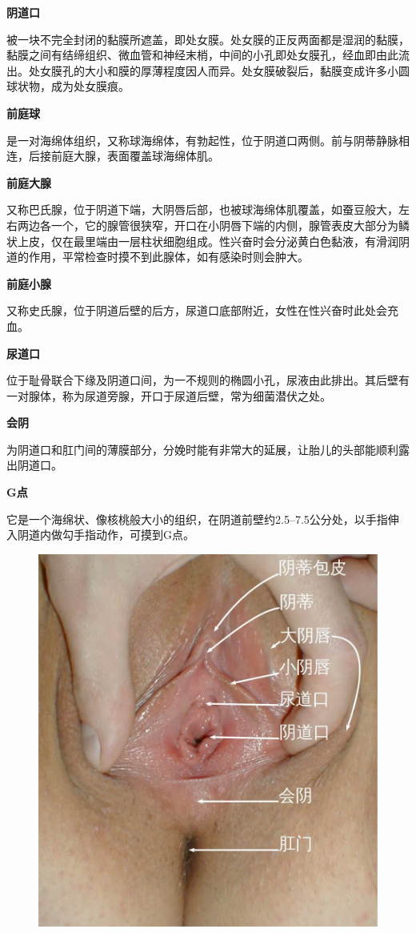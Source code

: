 \documentclass[12pt,UTF8]{ctexbook}
\begin{document}
\textbf{阴道口}

被一块不完全封闭的黏膜所遮盖，即处女膜。处女膜的正反两面都是湿润的黏膜，黏膜之间有结缔组织、微血管和神经末梢，中间的小孔即处女膜孔，经血即由此流出。处女膜孔的大小和膜的厚薄程度因人而异。处女膜破裂后，黏膜变成许多小圆球状物，成为处女膜痕。

\textbf{前庭球}

是一对海绵体组织，又称球海绵体，有勃起性，位于阴道口两侧。前与阴蒂静脉相连，后接前庭大腺，表面覆盖球海绵体肌。

\textbf{前庭大腺}

又称巴氏腺，位于阴道下端，大阴唇后部，也被球海绵体肌覆盖，如蚕豆般大，左右两边各一个，它的腺管很狭窄，开口在小阴唇下端的内侧，腺管表皮大部分为鳞状上皮，仅在最里端由一层柱状细胞组成。性兴奋时会分泌黄白色黏液，有滑润阴道的作用，平常检查时摸不到此腺体，如有感染时则会肿大。

\textbf{前庭小腺}

又称史氏腺，位于阴道后壁的后方，尿道口底部附近，女性在性兴奋时此处会充血。

\textbf{尿道口}

位于耻骨联合下缘及阴道口间，为一不规则的椭圆小孔，尿液由此排出。其后壁有一对腺体，称为尿道旁腺，开口于尿道后壁，常为细菌潜伏之处。

\textbf{会阴}

为阴道口和肛门间的薄膜部分，分娩时能有非常大的延展，让胎儿的头部能顺利露出阴道口。

\textbf{G点}

它是一个海绵状、像核桃般大小的组织，在阴道前壁约2.5--7.5公分处，以手指伸入阴道内做勾手指动作，可摸到G点。

\begin{figure}[H]
	\centering
	\includegraphics[width=0.7\linewidth]{1}
	\caption{}
	\label{fig:1}
\end{figure}
\end{document}
